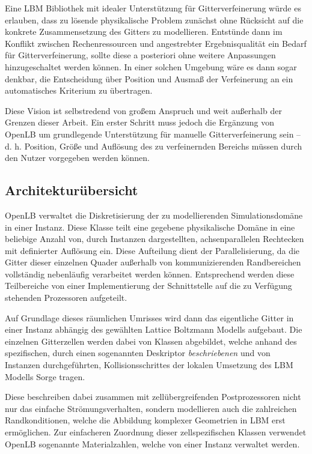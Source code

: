 \bigskip
Eine LBM Bibliothek mit idealer Unterstützung für Gitterverfeinerung würde es erlauben, dass zu lösende physikalische Problem zunächst ohne Rücksicht auf die konkrete Zusammensetzung des Gitters zu modellieren. Entstünde dann im Konflikt zwischen Rechenressourcen und angestrebter Ergebnisqualität ein Bedarf für Gitterverfeinerung, sollte diese a posteriori ohne weitere Anpassungen hinzugeschaltet werden können. In einer solchen Umgebung wäre es dann sogar denkbar, die Entscheidung über Position und Ausmaß der Verfeinerung an ein automatisches Kriterium \cite{Lagrava15} zu übertragen.

Diese Vision ist selbstredend von großem Anspruch und weit außerhalb der Grenzen dieser Arbeit. Ein erster Schritt muss jedoch die Ergänzung von OpenLB um grundlegende Unterstützung für manuelle Gitterverfeinerung sein -- d. h. Position, Größe und Auflösung des zu verfeinernden Bereichs müssen durch den Nutzer vorgegeben werden können.

\subsection{Architekturübersicht}

OpenLB verwaltet die Diskretisierung der zu modellierenden Simulationsdomäne in einer  Instanz. Diese Klasse teilt eine gegebene physikalische Domäne in eine beliebige Anzahl von, durch  Instanzen dargestellten, achsenparallelen Rechtecken mit definierter Auflösung ein. Diese Aufteilung dient der Parallelisierung, da die Gitter dieser einzelnen Quader außerhalb von kommunizierenden Randbereichen vollständig nebenläufig verarbeitet werden können. Entsprechend werden diese Teilbereiche von einer Implementierung der  Schnittstelle auf die zu Verfügung stehenden Prozessoren aufgeteilt.

Auf Grundlage dieses räumlichen Umrisses wird dann das eigentliche Gitter in einer  Instanz abhängig des gewählten Lattice Boltzmann Modells aufgebaut. Die einzelnen Gitterzellen werden dabei von  Klassen abgebildet, welche anhand des spezifischen, durch einen sogenannten Deskriptor \emph{beschriebenen} und von  Instanzen durchgeführten, Kollisionsschrittes der lokalen Umsetzung des LBM Modells Sorge tragen.

Diese  beschreiben dabei zusammen mit zellübergreifenden Postprozessoren nicht nur das einfache Strömungsverhalten, sondern modellieren auch die zahlreichen Randkonditionen, welche die Abbildung komplexer Geometrien in LBM erst ermöglichen.
Zur einfacheren Zuordnung dieser zellspezifischen Klassen verwendet OpenLB sogenannte Materialzahlen, welche von einer  Instanz verwaltet werden.

